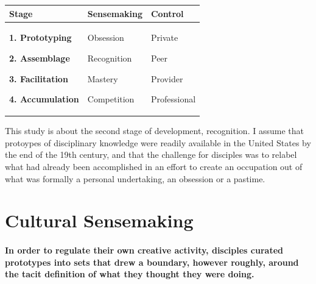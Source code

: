 \documentclass[]{article}
\begin{document}
\begin{longtable}[c]{@{}lll@{}}
\toprule
\begin{minipage}[b]{0.28\columnwidth}\raggedright\strut
\textbf{Stage}
\strut\end{minipage} &
\begin{minipage}[b]{0.23\columnwidth}\raggedright\strut
\textbf{Sensemaking}
\strut\end{minipage} &
\begin{minipage}[b]{0.19\columnwidth}\raggedright\strut
\textbf{Control}
\strut\end{minipage}\tabularnewline
\midrule
\endhead
\begin{minipage}[t]{0.28\columnwidth}\raggedright\strut
\textbf{1. Prototyping}

\textbf{2. Assemblage}

\textbf{3. Facilitation}

\textbf{4. Accumulation}
\strut\end{minipage} &
\begin{minipage}[t]{0.23\columnwidth}\raggedright\strut
Obsession

Recognition

Mastery

Competition
\strut\end{minipage} &
\begin{minipage}[t]{0.19\columnwidth}\raggedright\strut
Private

Peer

Provider

Professional
\strut\end{minipage}\tabularnewline
\bottomrule
\end{longtable}

This study is about the second stage of development, recognition. I
assume that protoypes of disciplinary knowledge were readily available
in the United States by the end of the 19th century, and that the
challenge for disciples was to relabel what had already been
accomplished in an effort to create an occupation out of what was
formally a personal undertaking, an obsession or a pastime.

\section{Cultural Sensemaking}\label{cultural-sensemaking}

\paragraph{In order to regulate their own creative activity, disciples
curated prototypes into sets that drew a boundary, however roughly,
around the tacit definition of what they thought they were
doing.}\label{in-order-to-regulate-their-own-creative-activity-disciples-curated-prototypes-into-sets-that-drew-a-boundary-however-roughly-around-the-tacit-definition-of-what-they-thought-they-were-doing.}
\end{document}
